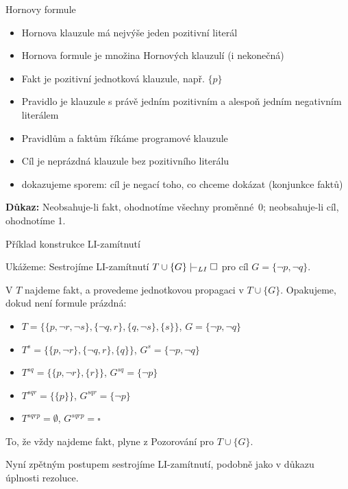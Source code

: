 \documentclass{beamer}
\begin{document}
\begin{frame}{Hornovy formule}
        
    \begin{itemize}
        \item \alert{Hornova klauzule} má nejvýše jeden pozitivní literál
        \item \alert{Hornova formule} je množina Hornových klauzulí (i nekonečná)
        \item \alert{Fakt} je pozitivní jednotková klauzule, např. $\{p\}$
        \item \alert{Pravidlo} je klauzule s právě jedním pozitivním a alespoň jedním negativním literálem
        \item Pravidlům a faktům říkáme \alert{programové klauzule}
        \item \alert{Cíl} je neprázdná klauzule bez pozitivního literálu       
        \item dokazujeme sporem: \alert{cíl} je negací toho, co chceme dokázat (konjunkce faktů)
    \end{itemize}


    \textbf{Důkaz:} Neobsahuje-li fakt, ohodnotíme všechny proměnné~0; neobsahuje-li cíl, ohodnotíme 1.\hfill\qedsymbol

\end{frame}


\begin{frame}{Příklad konstrukce LI-zamítnutí}
    
    Ukážeme:  Sestrojíme LI-zamítnutí $T\cup\{G\}\proves_{LI}\square$ pro cíl $G=\{\neg p,\neg q\}$. 
    
    
    V $T$ \alert{najdeme fakt}, a provedeme \alert{jednotkovou propagaci} v $T\cup\{G\}$. Opakujeme, dokud není formule prázdná:
    \begin{itemize}
        \item $T=\{\{p,\neg r,\neg s\},\{\neg q,r\},\{q,\neg s\},\{s\}\}$, $G=\{\neg p,\neg q\}$
        \item $T^s=\{\{p,\neg r\},\{\neg q,r\},\{q\}\}$, $G^s=\{\neg p,\neg q\}$
        \item $T^{sq}=\{\{p,\neg r\},\{r\}\}$, $G^{sq}=\{\neg p\}$
        \item $T^{sqr}=\{\{p\}\}$, $G^{sqr}=\{\neg p\}$
        \item $T^{sqrp}=\emptyset$, $G^{sqrp}=\square$
    \end{itemize}

    To, že vždy najdeme fakt, plyne z Pozorování pro $T\cup\{G\}$.

    Nyní zpětným postupem sestrojíme LI-zamítnutí, podobně jako v důkazu úplnosti rezoluce.
    
\end{frame}
\end{document}
